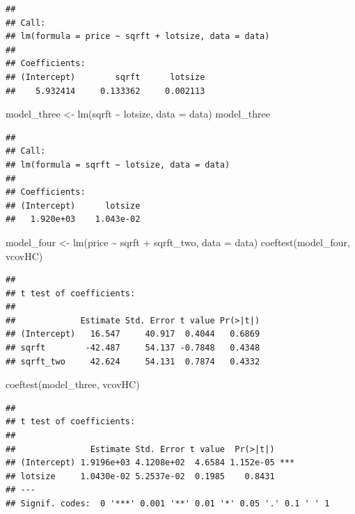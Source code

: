 \documentclass[
]{book}
\newenvironment{Shaded}{\begin{snugshade}}{\end{snugshade}}
\newcommand{\AttributeTok}[1]{\textcolor[rgb]{0.77,0.63,0.00}{#1}}
\newcommand{\FunctionTok}[1]{\textcolor[rgb]{0.00,0.00,0.00}{#1}}
\newcommand{\NormalTok}[1]{#1}
\newcommand{\OtherTok}[1]{\textcolor[rgb]{0.56,0.35,0.01}{#1}}
\newcommand{\SpecialCharTok}[1]{\textcolor[rgb]{0.00,0.00,0.00}{#1}}
\theoremstyle{definition}
\theoremstyle{definition}
\theoremstyle{definition}
\theoremstyle{definition}
\theoremstyle{remark}
\begin{document}
\begin{verbatim}
## 
## Call:
## lm(formula = price ~ sqrft + lotsize, data = data)
## 
## Coefficients:
## (Intercept)        sqrft      lotsize  
##    5.932414     0.133362     0.002113
\end{verbatim}

\begin{Shaded}
\begin{Highlighting}[]
\NormalTok{model\_three }\OtherTok{\textless{}{-}} \FunctionTok{lm}\NormalTok{(sqrft }\SpecialCharTok{\textasciitilde{}}\NormalTok{ lotsize, }\AttributeTok{data =}\NormalTok{ data)}
\NormalTok{model\_three}
\end{Highlighting}
\end{Shaded}

\begin{verbatim}
## 
## Call:
## lm(formula = sqrft ~ lotsize, data = data)
## 
## Coefficients:
## (Intercept)      lotsize  
##   1.920e+03    1.043e-02
\end{verbatim}

\begin{Shaded}
\begin{Highlighting}[]
\NormalTok{model\_four }\OtherTok{\textless{}{-}} \FunctionTok{lm}\NormalTok{(price }\SpecialCharTok{\textasciitilde{}}\NormalTok{ sqrft }\SpecialCharTok{+}\NormalTok{ sqrft\_two, }\AttributeTok{data =}\NormalTok{ data)}
\FunctionTok{coeftest}\NormalTok{(model\_four, vcovHC)}
\end{Highlighting}
\end{Shaded}

\begin{verbatim}
## 
## t test of coefficients:
## 
##             Estimate Std. Error t value Pr(>|t|)
## (Intercept)   16.547     40.917  0.4044   0.6869
## sqrft        -42.487     54.137 -0.7848   0.4348
## sqrft_two     42.624     54.131  0.7874   0.4332
\end{verbatim}

\begin{Shaded}
\begin{Highlighting}[]
\FunctionTok{coeftest}\NormalTok{(model\_three, vcovHC)}
\end{Highlighting}
\end{Shaded}

\begin{verbatim}
## 
## t test of coefficients:
## 
##               Estimate Std. Error t value  Pr(>|t|)    
## (Intercept) 1.9196e+03 4.1208e+02  4.6584 1.152e-05 ***
## lotsize     1.0430e-02 5.2537e-02  0.1985    0.8431    
## ---
## Signif. codes:  0 '***' 0.001 '**' 0.01 '*' 0.05 '.' 0.1 ' ' 1
\end{verbatim}
\end{document}
